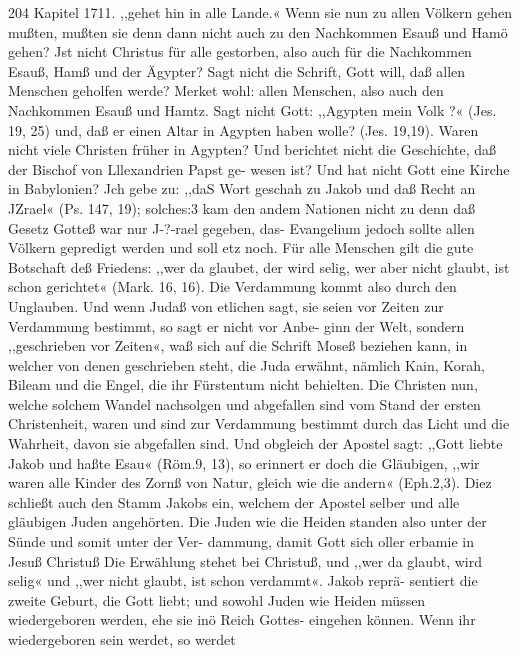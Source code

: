 204 Kapitel 1711.
,,gehet hin in alle Lande.« Wenn sie nun zu allen Völkern gehen
mußten, mußten sie denn dann nicht auch zu den Nachkommen
Esauß und Hamö gehen? Jst nicht Christus für alle gestorben,
also auch für die Nachkommen Esauß, Hamß und der Ägypter?
Sagt nicht die Schrift, Gott will, daß allen Menschen geholfen werde?
Merket wohl: allen Menschen, also auch den Nachkommen Esauß
und Hamtz. Sagt nicht Gott: ,,Agypten mein Volk ?« (Jes. 19, 25)
und, daß er einen Altar in Agypten haben wolle? (Jes. 19,19).
Waren nicht viele Christen früher in Agypten? Und berichtet
nicht die Geschichte, daß der Bischof von Lllexandrien Papst ge-
wesen ist? Und hat nicht Gott eine Kirche in Babylonien? Jch
gebe zu: ,,daS Wort geschah zu Jakob und daß Recht an JZrael«
(Ps. 147, 19); solches:3 kam den andem Nationen nicht zu
denn daß Gesetz Gotteß war nur J-?-rael gegeben, das- Evangelium
jedoch sollte allen Völkern gepredigt werden und soll etz noch.
Für alle Menschen gilt die gute Botschaft deß Friedens: ,,wer
da glaubet, der wird selig, wer aber nicht glaubt, ist schon
gerichtet« (Mark. 16, 16). Die Verdammung kommt also durch
den Unglauben. Und wenn Judaß von etlichen sagt, sie seien
vor Zeiten zur Verdammung bestimmt, so sagt er nicht vor Anbe-
ginn der Welt, sondern ,,geschrieben vor Zeiten«, waß sich auf
die Schrift Moseß beziehen kann, in welcher von denen geschrieben
steht, die Juda erwähnt, nämlich Kain, Korah, Bileam und die
Engel, die ihr Fürstentum nicht behielten. Die Christen nun,
welche solchem Wandel nachsolgen und abgefallen sind vom Stand
der ersten Christenheit, waren und sind zur Verdammung bestimmt
durch das Licht und die Wahrheit, davon sie abgefallen sind.
Und obgleich der Apostel sagt: ,,Gott liebte Jakob und haßte
Esau« (Röm.9, 13), so erinnert er doch die Gläubigen, ,,wir waren
alle Kinder des Zornß von Natur, gleich wie die andern« (Eph.2,3).
Diez schließt auch den Stamm Jakobs ein, welchem der Apostel
selber und alle gläubigen Juden angehörten. Die Juden wie die
Heiden standen also unter der Sünde und somit unter der Ver-
dammung, damit Gott sich oller erbamie in Jesuß Christuß
Die Erwählung stehet bei Christuß, und ,,wer da glaubt, wird
selig« und ,,wer nicht glaubt, ist schon verdammt«. Jakob reprä-
sentiert die zweite Geburt, die Gott liebt; und sowohl Juden
wie Heiden müssen wiedergeboren werden, ehe sie inö Reich Gottes-
eingehen können. Wenn ihr wiedergeboren sein werdet, so werdet


